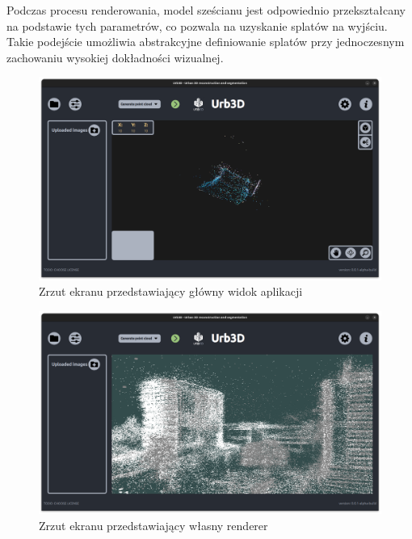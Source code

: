 Podczas procesu renderowania, model sześcianu jest odpowiednio przekształcany na podstawie tych parametrów, co pozwala na uzyskanie splatów na wyjściu. Takie podejście umożliwia abstrakcyjne definiowanie splatów przy jednoczesnym zachowaniu wysokiej dokładności wizualnej.

\clearpage

\begin{figure}[!ht]
    \centering
    \includegraphics[width=\textwidth]{images/UI-Rendering.png}
    \caption{Zrzut ekranu przedstawiający główny widok aplikacji}
    \label{fig:ui}
\end{figure}

\begin{figure}[!ht]
    \centering
    \includegraphics[width=\textwidth]{images/cloud_rendering.png}
    \caption{Zrzut ekranu przedstawiający własny renderer}
    \label{fig:rendering}
\end{figure}
